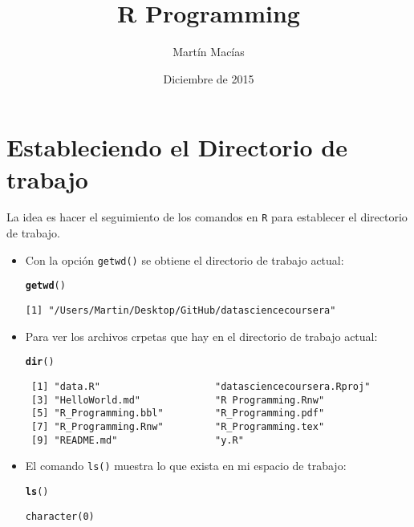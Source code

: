 \documentclass{article}\usepackage[]{graphicx}\usepackage[]{color}
\title{R Programming}
\author{Martín Macías}
\date{Diciembre de 2015}
\makeatletter
\newcommand{\hlstd}[1]{\textcolor[rgb]{0.345,0.345,0.345}{#1}}%
\newcommand{\hlkwd}[1]{\textcolor[rgb]{0.737,0.353,0.396}{\textbf{#1}}}%
\newenvironment{kframe}{%
 \def\at@end@of@kframe{}%
 \ifinner\ifhmode%
  \def\at@end@of@kframe{\end{minipage}}%
  \begin{minipage}{\columnwidth}%
 \fi\fi%
 \def\FrameCommand##1{\hskip\@totalleftmargin \hskip-\fboxsep
 \colorbox{shadecolor}{##1}\hskip-\fboxsep
     \hskip-\linewidth \hskip-\@totalleftmargin \hskip\columnwidth}%
 \MakeFramed {\advance\hsize-\width
   \@totalleftmargin\z@ \linewidth\hsize
   \@setminipage}}%
 {\par\unskip\endMakeFramed%
 \at@end@of@kframe}
\newenvironment{knitrout}{}{} %
\makeatother
\begin{document}
\maketitle

\section{Estableciendo el Directorio de trabajo}
La idea es hacer el seguimiento de los comandos en \texttt{R} para establecer el directorio de trabajo.\\
\begin{itemize}
  \item Con la opción \texttt{getwd()} se obtiene el directorio de trabajo actual:
\begin{knitrout}
\color{fgcolor}\begin{kframe}
\begin{alltt}
  \hlkwd{getwd}\hlstd{()}
\end{alltt}
\begin{verbatim}
[1] "/Users/Martin/Desktop/GitHub/datasciencecoursera"
\end{verbatim}
\end{kframe}
\end{knitrout}

  \item Para ver los archivos  crpetas que hay en el directorio de trabajo actual:
\begin{knitrout}
\color{fgcolor}\begin{kframe}
\begin{alltt}
  \hlkwd{dir}\hlstd{()}
\end{alltt}
\begin{verbatim}
 [1] "data.R"                    "datasciencecoursera.Rproj"
 [3] "HelloWorld.md"             "R Programming.Rnw"        
 [5] "R_Programming.bbl"         "R_Programming.pdf"        
 [7] "R_Programming.Rnw"         "R_Programming.tex"        
 [9] "README.md"                 "y.R"                      
\end{verbatim}
\end{kframe}
\end{knitrout}

  \item El comando \texttt{ls()} muestra lo que exista en mi espacio de trabajo:
\begin{knitrout}
\color{fgcolor}\begin{kframe}
\begin{alltt}
  \hlkwd{ls}\hlstd{()}
\end{alltt}
\begin{verbatim}
character(0)
\end{verbatim}
\end{kframe}
\end{knitrout}
\end{itemize}
\end{document}
